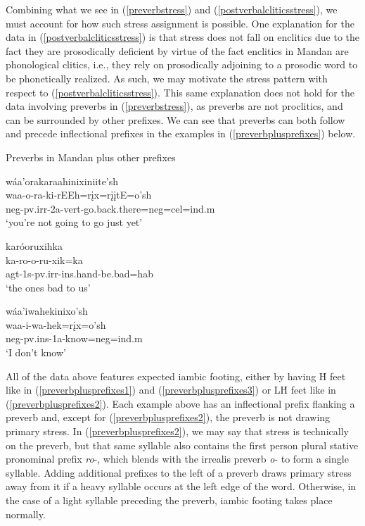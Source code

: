 Combining what we see in (\ref{preverbstress}) and (\ref{postverbalcliticsstress}), we must account for how such stress assignment is possible. One explanation for the data in (\ref{postverbalcliticsstress}) is that stress does not fall on enclitics due to the fact they are prosodically deficient by virtue of the fact enclitics in Mandan are phonological clitics, i.e., they rely on prosodically adjoining to a prosodic word to be phonetically realized. As such, we may motivate the stress pattern with respect to (\ref{postverbalcliticsstress}). This same explanation does not hold for the data involving preverbs in (\ref{preverbstress}), as preverbs are not proclitics, and can be surrounded by other prefixes. We can see that preverbs can both follow and precede inflectional prefixes in the examples in (\ref{preverbplusprefixes}) below.



\begin{exe}
\item\label{preverbplusprefixes} Preverbs in Mandan plus other prefixes

	\begin{xlist}
	\item\label{preverbplusprefixes1} \glll	wáa'orakaraahinixiniite'sh\\
	waa-o-ra-ki-rEEh=rįx=rįįtE=o'sh\\
	neg-pv.irr-2a-vert-\textnormal{go.back.there}=neg=cel=ind.m\\
	\glt `you're not going to go just yet' \citep[216]{hollow1973b}

	\item\label{preverbplusprefixes2} \glll	karóoruxihka\\
	ka-ro-o-ru-xik=ka\\
	agt-1s-pv.irr-ins.hand-\textnormal{be.bad}=hab\\
	\glt `the ones bad to us' \citep[45]{hollow1973b}

	\item\label{preverbplusprefixes3} \glll	wáa'iwahekinixo'sh\\
	waa-i-wa-hek=rįx=o'sh\\
	neg-pv.ins-1a-\textnormal{know}=neg=ind.m\\
	\glt `I don't know' \citep[47]{hollow1973a}
	\end{xlist}
\end{exe}

All of the data above features expected iambic footing, either by having H́ feet like in (\ref{preverbplusprefixes1}) and (\ref{preverbplusprefixes3}) or LH́ feet like in (\ref{preverbplusprefixes2}). Each example above has an inflectional prefix flanking a preverb and, except for (\ref{preverbplusprefixes2}), the preverb is not drawing primary stress. In (\ref{preverbplusprefixes2}), we may say that stress is technically on the preverb, but that same syllable also contains the first person plural stative pronominal prefix \textit{ro}-, which blends with the irrealis preverb \textit{o}- to form a single syllable. Adding additional prefixes to the left of a preverb draws primary stress away from it if a heavy syllable occurs at the left edge of the word. Otherwise, in the case of a light syllable preceding the preverb, iambic footing takes place normally.

